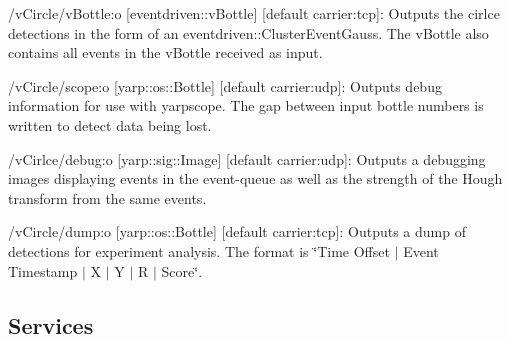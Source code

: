 \begin{DoxyItemize}
\item /v\+Circle/v\+Bottle\+:o \mbox{[}eventdriven\+::v\+Bottle\mbox{]} \mbox{[}default carrier\+:tcp\mbox{]}\+: Outputs the cirlce detections in the form of an eventdriven\+::\+Cluster\+Event\+Gauss. The v\+Bottle also contains all events in the v\+Bottle received as input.
\item /v\+Circle/scope\+:o \mbox{[}yarp\+::os\+::\+Bottle\mbox{]} \mbox{[}default carrier\+:udp\mbox{]}\+: Outputs debug information for use with yarpscope. The gap between input bottle numbers is written to detect data being lost.
\item /v\+Cirlce/debug\+:o \mbox{[}yarp\+::sig\+::\+Image\mbox{]} \mbox{[}default carrier\+:udp\mbox{]}\+: Outputs a debugging images displaying events in the event-\/queue as well as the strength of the Hough transform from the same events.
\item /v\+Circle/dump\+:o \mbox{[}yarp\+::os\+::\+Bottle\mbox{]} \mbox{[}default carrier\+:tcp\mbox{]}\+: Outputs a dump of detections for experiment analysis. The format is \char`\"{}\+Time Offset $\vert$ Event Timestamp $\vert$ X $\vert$ Y $\vert$ R $\vert$ Score\char`\"{}.
\end{DoxyItemize}\hypertarget{group__vUndistortCam_services_sec}{}\subsection{Services}\label{group__vUndistortCam_services_sec}
